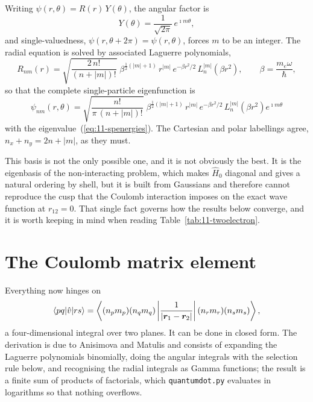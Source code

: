 Writing $\psi(r,\theta)=R(r)\,Y(\theta)$, the angular factor is
\begin{equation}
  Y(\theta) = \frac{1}{\sqrt{2\pi}}\,e^{\imath m\theta},
  \label{eq:11-angular}
\end{equation}
and single-valuedness, $\psi(r,\theta+2\pi)=\psi(r,\theta)$, forces $m$ to be
an integer.  The radial equation is solved by associated Laguerre polynomials,
\begin{equation}
  R_{nm}(r) = \sqrt{\frac{2\,n!}{(n+|m|)!}}\;
    \beta^{\frac12(|m|+1)}\,
    r^{|m|}\,e^{-\beta r^2/2}\,
    L_n^{|m|}\!\left(\beta r^2\right),
  \qquad \beta = \frac{m_e\omega}{\hbar},
  \label{eq:11-radial}
\end{equation}
so that the complete single-particle eigenfunction is
\begin{equation}
  \boxed{\;
  \psi_{nm}(r,\theta)
   = \sqrt{\frac{n!}{\pi\,(n+|m|)!}}\;
     \beta^{\frac12(|m|+1)}\,
     r^{|m|}\,e^{-\beta r^2/2}\,
     L_n^{|m|}\!\left(\beta r^2\right)e^{\imath m\theta} \;}
  \label{eq:11-eigenfunction}
\end{equation}
with the eigenvalue~(\ref{eq:11-spenergies}).  The Cartesian and polar
labellings agree, $n_x+n_y=2n+|m|$, as they must.

This basis is not the only possible one, and it is not obviously the best.  It
is the eigenbasis of the non-interacting problem, which makes $\hat{H}_0$
diagonal and gives a natural ordering by shell, but it is built from Gaussians
and therefore cannot reproduce the cusp that the Coulomb interaction imposes
on the exact wave function at $r_{12}=0$.  That single fact governs how the
results below converge, and it is worth keeping in mind when reading
Table~\ref{tab:11-twoelectron}.

\section{The Coulomb matrix element}
\label{sec:qdcoulomb}

Everything now hinges on
\begin{equation}
  \langle pq | \hat{v} | rs \rangle
   = \left\langle (n_pm_p)(n_qm_q)\left\vert
       \frac{1}{|\bm{r}_1-\bm{r}_2|}
     \right\vert (n_rm_r)(n_sm_s)\right\rangle ,
  \label{eq:11-coulombelement}
\end{equation}
a four-dimensional integral over two planes.  It can be done in closed form.
The derivation is due to Anisimova and Matulis and consists of expanding the
Laguerre polynomials binomially, doing the angular integrals with the
selection rule below, and recognising the radial integrals as Gamma functions;
the result is a finite sum of products of factorials, which
\texttt{quantumdot.py} evaluates in logarithms so that nothing overflows.

